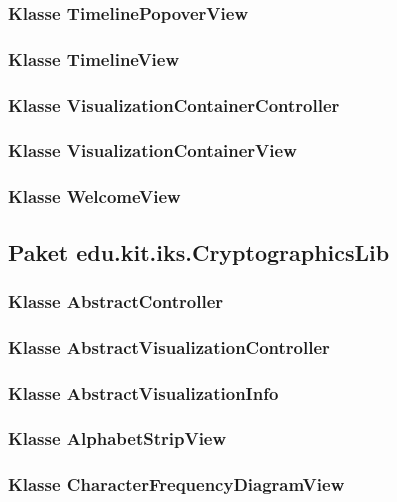 \documentclass{article}
\begin{document}
    \subsubsection{Klasse TimelinePopoverView}

    \subsubsection{Klasse TimelineView}

    \subsubsection{Klasse VisualizationContainerController}

    \subsubsection{Klasse VisualizationContainerView}

    \subsubsection{Klasse WelcomeView}

  \subsection{Paket edu.kit.iks.CryptographicsLib}
    
  	\subsubsection{Klasse AbstractController}

	\subsubsection{Klasse AbstractVisualizationController}

	\subsubsection{Klasse AbstractVisualizationInfo}

	\subsubsection{Klasse AlphabetStripView}

	\subsubsection{Klasse CharacterFrequencyDiagramView}
\end{document}
